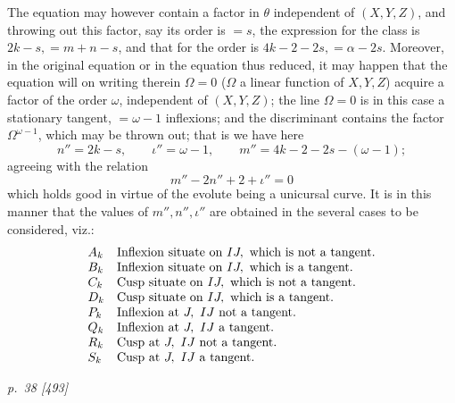 ﻿\documentclass[11pt,a4paper]{article}
\theoremstyle{plain}
\theoremstyle{definition}
\begin{document}
The equation may however contain a factor in \(\theta\) independent of
\((X,Y,Z)\), and throwing out this factor, say its order is \(=s\), the
expression for the class is \(2k-s,=m+n-s\), and that for the order is
\(4k-2-2s,=\alpha-2s\). Moreover, in the original equation or in the
equation thus reduced, it may happen that the equation will on writing
therein \(\Omega=0\) (\(\Omega\) a linear function of \(X,Y,Z\)) acquire a
factor of the order \(\omega\), independent of \((X,Y,Z)\); the line
\(\Omega=0\) is in this case a stationary tangent, \(=\omega-1\)
inflexions; and the discriminant contains the factor \(\Omega^{\omega-1}\),
which may be thrown out; that is we have here
\[
n''=2k-s,\qquad
\iota''=\omega-1,\qquad
m''=4k-2-2s-(\omega-1);
\]
agreeing with the relation
\[
m''-2n''+2+\iota''=0
\]
which holds good in virtue of the evolute being a unicursal curve. It is
in this manner that the values of \(m'',n'',\iota''\) are obtained in the
several cases to be considered, viz.:
\[
\begin{array}{ll}
A_k&\hbox{Inflexion situate on }IJ,\hbox{ which is not a tangent.}\\
B_k&\hbox{Inflexion situate on }IJ,\hbox{ which is a tangent.}\\
C_k&\hbox{Cusp situate on }IJ,\hbox{ which is not a tangent.}\\
D_k&\hbox{Cusp situate on }IJ,\hbox{ which is a tangent.}\\
P_k&\hbox{Inflexion at }J,\ IJ\hbox{ not a tangent.}\\
Q_k&\hbox{Inflexion at }J,\ IJ\hbox{ a tangent.}\\
R_k&\hbox{Cusp at }J,\ IJ\hbox{ not a tangent.}\\
S_k&\hbox{Cusp at }J,\ IJ\hbox{ a tangent.}
\end{array}
\]

\clearpage
\textit{p.~38 [493]}
\end{document}
